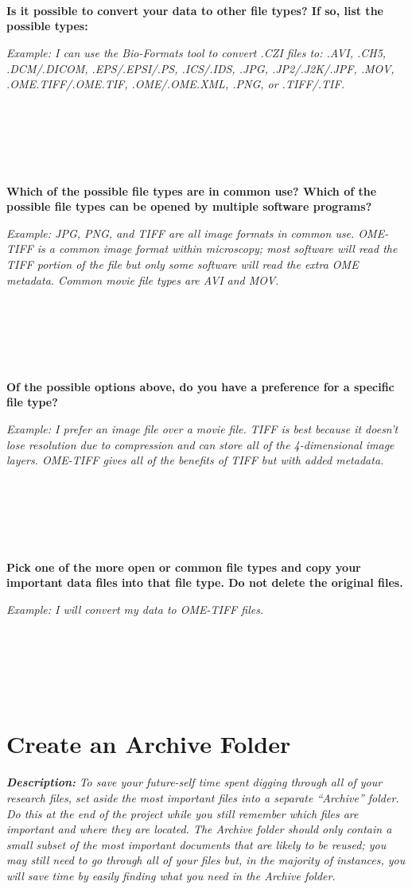 \documentclass[
]{book}
\begin{document}
~

~

~

\textbf{Is it possible to convert your data to other file types? If so, list the possible types:}

\emph{Example: I can use the Bio-Formats tool to convert .CZI files to: .AVI, .CH5, .DCM/.DICOM, .EPS/.EPSI/.PS, .ICS/.IDS, .JPG, .JP2/.J2K/.JPF, .MOV, .OME.TIFF/.OME.TIF, .OME/.OME.XML, .PNG, or .TIFF/.TIF.}

~

~

~

\textbf{Which of the possible file types are in common use? Which of the possible file types can be opened by multiple software programs?}

\emph{Example: JPG, PNG, and TIFF are all image formats in common use. OME-TIFF is a common image format within microscopy; most software will read the TIFF portion of the file but only some software will read the extra OME metadata. Common movie file types are AVI and MOV.}

~

~

~

\textbf{Of the possible options above, do you have a preference for a specific file type?}

\emph{Example: I prefer an image file over a movie file. TIFF is best because it doesn't lose resolution due to compression and can store all of the 4-dimensional image layers. OME-TIFF gives all of the benefits of TIFF but with added metadata.}

~

~

~

\textbf{Pick one of the more open or common file types and copy your important data files into that file type. Do not delete the original files.}

\emph{Example: I will convert my data to OME-TIFF files.}

~

~

~

\newpage

\hypertarget{archive-folder}{%
\section{Create an Archive Folder}\label{archive-folder}}

\textbf{\emph{Description:}} \emph{To save your future-self time spent digging through all of your research files, set aside the most important files into a separate ``Archive'' folder. Do this at the end of the project while you still remember which files are important and where they are located. The Archive folder should only contain a small subset of the most important documents that are likely to be reused; you may still need to go through all of your files but, in the majority of instances, you will save time by easily finding what you need in the Archive folder.}
\end{document}
